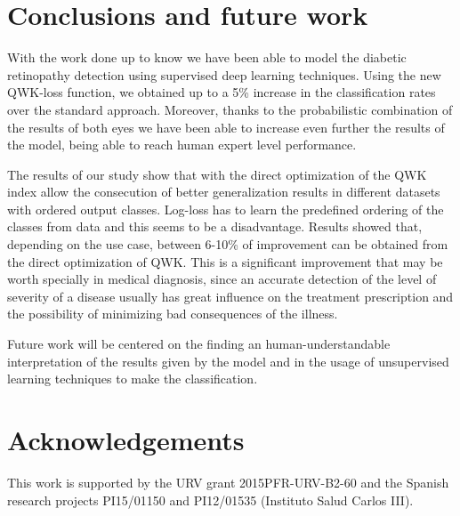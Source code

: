 \documentclass{dcsm}
\begin{document}
\section{Conclusions and future work}

With the work done up to know we have been able to model the diabetic retinopathy detection using supervised deep learning techniques. Using the new QWK-loss function, we obtained up to a 5\% increase in the classification rates over the standard approach. Moreover, thanks to the probabilistic combination of the results of both eyes we have been able to increase even further the results of the model, being able to reach human expert level performance.

The results of our study show that with the direct optimization of the QWK index allow the consecution of better generalization results in different datasets with ordered output classes. Log-loss has to learn the predefined ordering of the classes from data and this seems to be a disadvantage. Results showed that, depending on the use case, between 6-10\% of improvement can be obtained from the direct optimization of QWK. 
This is a significant improvement that may be worth specially in medical diagnosis, since an accurate detection of the level of severity of a disease usually has great influence on the treatment prescription and the possibility of minimizing bad consequences of the illness.

Future work will be centered on the finding an human-understandable interpretation of the results given by the model and in the usage of unsupervised learning techniques to make the classification.


\section*{Acknowledgements}
This work is supported by the URV grant 2015PFR-URV-B2-60 and the Spanish research projects PI15/01150 and PI12/01535 (Instituto Salud Carlos III). 




\end{document}
